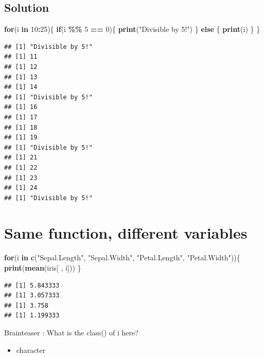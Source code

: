 \documentclass[
]{book}
\newenvironment{Shaded}{\begin{snugshade}}{\end{snugshade}}
\newcommand{\ControlFlowTok}[1]{\textcolor[rgb]{0.13,0.29,0.53}{\textbf{#1}}}
\newcommand{\DecValTok}[1]{\textcolor[rgb]{0.00,0.00,0.81}{#1}}
\newcommand{\FunctionTok}[1]{\textcolor[rgb]{0.13,0.29,0.53}{\textbf{#1}}}
\newcommand{\NormalTok}[1]{#1}
\newcommand{\SpecialCharTok}[1]{\textcolor[rgb]{0.81,0.36,0.00}{\textbf{#1}}}
\newcommand{\StringTok}[1]{\textcolor[rgb]{0.31,0.60,0.02}{#1}}
\providecommand{\tightlist}{%
  \setlength{\itemsep}{0pt}\setlength{\parskip}{0pt}}
\begin{document}
\subsection{Solution}\label{solution-6}

\begin{Shaded}
\begin{Highlighting}[]
\ControlFlowTok{for}\NormalTok{(i }\ControlFlowTok{in} \DecValTok{10}\SpecialCharTok{:}\DecValTok{25}\NormalTok{)\{}
  \ControlFlowTok{if}\NormalTok{(i }\SpecialCharTok{\%\%} \DecValTok{5} \SpecialCharTok{==} \DecValTok{0}\NormalTok{)\{}
    \FunctionTok{print}\NormalTok{(}\StringTok{"Divisible by 5!"}\NormalTok{)}
\NormalTok{  \} }\ControlFlowTok{else}\NormalTok{ \{}
    \FunctionTok{print}\NormalTok{(i) }
\NormalTok{  \}}
\NormalTok{\}}
\end{Highlighting}
\end{Shaded}

\begin{verbatim}
## [1] "Divisible by 5!"
## [1] 11
## [1] 12
## [1] 13
## [1] 14
## [1] "Divisible by 5!"
## [1] 16
## [1] 17
## [1] 18
## [1] 19
## [1] "Divisible by 5!"
## [1] 21
## [1] 22
## [1] 23
## [1] 24
## [1] "Divisible by 5!"
\end{verbatim}

\section{Same function, different variables}\label{same-function-different-variables}

\begin{Shaded}
\begin{Highlighting}[]
\ControlFlowTok{for}\NormalTok{(i }\ControlFlowTok{in} \FunctionTok{c}\NormalTok{(}\StringTok{"Sepal.Length"}\NormalTok{, }\StringTok{"Sepal.Width"}\NormalTok{, }\StringTok{"Petal.Length"}\NormalTok{, }\StringTok{"Petal.Width"}\NormalTok{))\{}
  \FunctionTok{print}\NormalTok{(}\FunctionTok{mean}\NormalTok{(iris[ , i]))}
\NormalTok{\}}
\end{Highlighting}
\end{Shaded}

\begin{verbatim}
## [1] 5.843333
## [1] 3.057333
## [1] 3.758
## [1] 1.199333
\end{verbatim}

Brainteaser : What is the class() of i here?

\begin{itemize}
\tightlist
\item
  character
\end{itemize}
\end{document}

